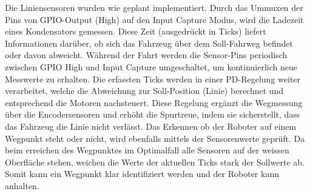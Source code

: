 Die Liniensensoren wurden wie geplant implementiert. Durch das Ummuxen der Pins von GPIO-Output (High) auf den Input Capture Modus, wird die Ladezeit eines Kondensators gemessen. Diese Zeit (ausgedrückt in Ticks) liefert Informationen darüber, ob sich das Fahrzeug über dem Soll-Fahrweg befindet oder davon abweicht. Während der Fahrt werden die Sensor-Pins periodisch zwischen GPIO High und Input Capture umgeschaltet, um kontinuierlich neue Messwerte zu erhalten. Die erfassten Ticks werden in einer PD-Regelung weiter verarbeitet, welche die Abweichung zur Soll-Position (Linie) berechnet und entsprechend die Motoren nachsteuert. Diese Regelung ergänzt die Wegmessung über die Encodersensoren und erhöht die Spurtreue, indem sie sicherstellt, dass das Fahrzeug die Linie nicht verlässt. Das Erkennen ob der Roboter auf einem Wegpunkt steht oder nicht, wird ebenfalls mittels der Sensorenwerte geprüft. Da beim erreichen des Wegpunktes im Optimalfall alle Sensoren auf der weissen Oberfläche stehen, weichen die Werte der aktuellen Ticks stark der Sollwerte ab. Somit kann ein Wegpunkt klar identifiziert werden und der Roboter kann anhalten.



